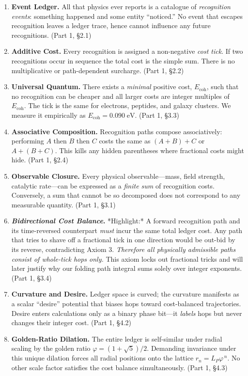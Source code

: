 \documentclass[11pt]{article}
\newcommand{\phiGR}{\varphi}                 %
\newcommand{\LP}{L_{\!P}}                    %
\newcommand{\Eoh}{E_{\mathrm{coh}}}          %
\begin{document}
\begin{enumerate}
\item \textbf{Event Ledger.}  
  All that physics ever reports is a catalogue of \emph{recognition
  events}: something happened and some entity “noticed.”  No event that
  escapes recognition leaves a ledger trace, hence cannot influence any
  future recognitions.  (Part 1, §2.1)

\item \textbf{Additive Cost.}  
  Every recognition is assigned a non-negative \emph{cost tick}.  If two
  recognitions occur in sequence the total cost is the simple sum.  There
  is no multiplicative or path-dependent surcharge.  (Part 1, §2.2)

\item \textbf{Universal Quantum.}  
  There exists a \emph{minimal} positive cost, \(\Eoh\), such that no
  recognition can be cheaper and all larger costs are integer multiples
  of \(\Eoh\).  The tick is the same for electrons, peptides, and galaxy
  clusters.  We measure it empirically as \(\Eoh = 0.090\;\text{eV}\).
  (Part 1, §3.3)

\item \textbf{Associative Composition.}  
  Recognition paths compose associatively: performing \(A\) then \(B\)
  then \(C\) costs the same as \((A+B)+C\) or \(A+(B+C)\).  This kills
  any hidden parentheses where fractional costs might hide.  (Part 1,
  §2.4)

\item \textbf{Observable Closure.}  
  Every physical observable—mass, field strength, catalytic rate—can be
  expressed as a \emph{finite sum} of recognition costs.  Conversely, a
  sum that cannot be so decomposed does not correspond to any measurable
  quantity.  (Part 1, §3.1)

\item \textbf{\emph{Bidirectional Cost Balance}.}  
  *Highlight:* A forward recognition path and its time-reversed
  counterpart \emph{must} incur the same total ledger cost.  Any path
  that tries to shave off a fractional tick in one direction would be
  out-bid by its reverse, contradicting Axiom 3.  \emph{Therefore all
  physically admissible paths consist of whole-tick hops only.}  This
  axiom locks out fractional tricks and will later justify why our
  folding path integral sums solely over integer exponents.  (Part 1,
  §3.4)

\item \textbf{Curvature and Desire.}  
  Ledger space is curved; the curvature manifests as a scalar “desire”
  potential that biases hops toward cost-balanced trajectories.  Desire
  enters calculations only as a binary phase bit—it \emph{labels} hops
  but never changes their integer cost.  (Part 1, §4.2)

\item \textbf{Golden-Ratio Dilation.}  
  The entire ledger is self-similar under radial scaling by the golden
  ratio \(\phiGR=(1+\sqrt5)/2\).  Demanding invariance under this unique
  dilation forces all radial positions onto the lattice
  \(r_n = \LP \phiGR^{\,n}\).  No other scale factor satisfies the cost
  balance simultaneously.  (Part 1, §4.3)
\end{enumerate}
\end{document}
